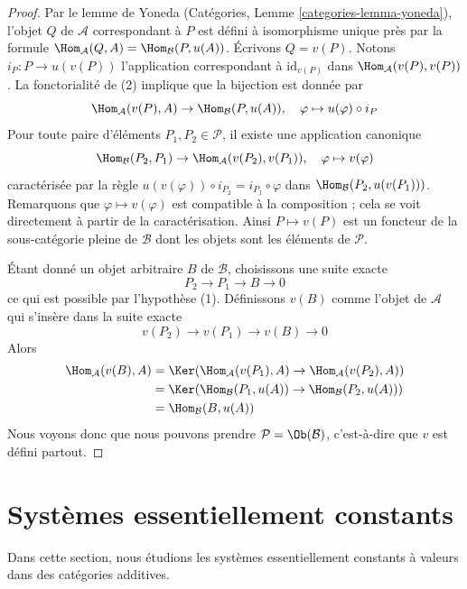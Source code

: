 \begin{proof}
Par le lemme de Yoneda (Catégories, Lemme \ref{categories-lemma-yoneda}),
l'objet $Q$ de $\mathcal{A}$ correspondant à $P$ est défini à isomorphisme
unique près par la formule
$\Hom_\mathcal{A}(Q, A) = \Hom_\mathcal{B}(P, u(A))$. Écrivons
$Q = v(P)$. Notons $i_P : P \to u(v(P))$ l'application correspondant à
$\text{id}_{v(P)}$ dans $\Hom_\mathcal{A}(v(P), v(P))$. La fonctorialité
de (2) implique que la bijection est donnée par
$$
\Hom_\mathcal{A}(v(P), A) \to \Hom_\mathcal{B}(P, u(A)),\quad
\varphi \mapsto u(\varphi) \circ i_P
$$
Pour toute paire d'éléments $P_1, P_2 \in \mathcal{P}$, il existe une
application canonique
$$
\Hom_\mathcal{B}(P_2, P_1)
\to
\Hom_\mathcal{A}(v(P_2), v(P_1)),\quad
\varphi \mapsto v(\varphi)
$$
caractérisée par la règle
$u(v(\varphi)) \circ i_{P_2} = i_{P_1} \circ \varphi$ dans
$\Hom_\mathcal{B}(P_2, u(v(P_1)))$.
Remarquons que $\varphi \mapsto v(\varphi)$ est
compatible à la composition ; cela se voit directement à partir de la
caractérisation. Ainsi $P \mapsto v(P)$ est un foncteur de la sous-catégorie
pleine de $\mathcal{B}$ dont les objets sont les éléments de $\mathcal{P}$.

\medskip\noindent
Étant donné un objet arbitraire $B$ de $\mathcal{B}$, choisissons une suite
exacte
$$
P_2 \to P_1 \to B \to 0
$$
ce qui est possible par l'hypothèse (1). Définissons $v(B)$ comme l'objet de
$\mathcal{A}$ qui s'insère dans la suite exacte
$$
v(P_2) \to v(P_1) \to v(B) \to 0
$$
Alors
\begin{align*}
\Hom_\mathcal{A}(v(B), A)
& =
\Ker(\Hom_\mathcal{A}(v(P_1), A) \to \Hom_\mathcal{A}(v(P_2), A)) \\
& =
\Ker(\Hom_\mathcal{B}(P_1, u(A)) \to \Hom_\mathcal{B}(P_2, u(A))) \\
& =
\Hom_\mathcal{B}(B, u(A))
\end{align*}
Nous voyons donc que nous pouvons prendre
$\mathcal{P} = \Ob(\mathcal{B})$, c'est-à-dire que $v$ est défini partout.
\end{proof}

\section{Systèmes essentiellement constants}
\label{section-essentially-constant}

\noindent
Dans cette section, nous étudions les systèmes essentiellement constants
à valeurs dans des catégories additives.

